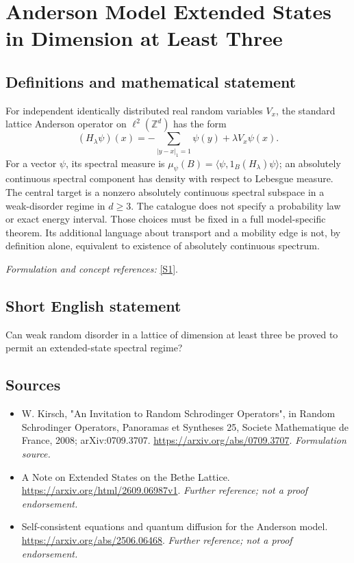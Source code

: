 \documentclass[11pt]{article}
\begin{document}
\section*{\texorpdfstring{Anderson Model Extended States in Dimension at Least Three}{Anderson Model Extended States in Dimension at Least Three}}\label{31}
\subsection{Definitions and mathematical statement}
For independent identically distributed real random variables $V_x$, the standard lattice Anderson operator on $\ell^2({\mathbb{Z}}^d)$ has the form
\[
 (H_\lambda\psi)(x)=-\sum_{|y-x|_1=1}\psi(y)+\lambda V_x\psi(x).
\]
For a vector $\psi$, its spectral measure is $\mu_\psi(B)=\langle\psi,1_B(H_\lambda)\psi\rangle$; an absolutely continuous spectral component has density with respect to Lebesgue measure. The central target is a nonzero absolutely continuous spectral subspace in a weak-disorder regime in $d\ge3$. The catalogue does not specify a probability law or exact energy interval. Those choices must be fixed in a full model-specific theorem. Its additional language about transport and a mobility edge is not, by definition alone, equivalent to existence of absolutely continuous spectrum.
\par\smallskip\textit{Formulation and concept references:} \href{https://arxiv.org/abs/0709.3707}{[S1]}.

\subsection{Short English statement}
Can weak random disorder in a lattice of dimension at least three be proved to permit an extended-state spectral regime?
\subsection{Sources}
\begin{itemize}
\item[S1]W. Kirsch, "An Invitation to Random Schrodinger Operators", in Random Schrodinger Operators, Panoramas et Syntheses 25, Societe Mathematique de France, 2008; arXiv:0709.3707.
\url{https://arxiv.org/abs/0709.3707}.
\textit{Formulation source.}
\item[S2]A Note on Extended States on the Bethe Lattice.
\url{https://arxiv.org/html/2609.06987v1}.
\textit{Further reference; not a proof endorsement.}
\item[S3]Self-consistent equations and quantum diffusion for the Anderson model.
\url{https://arxiv.org/abs/2506.06468}.
\textit{Further reference; not a proof endorsement.}
\end{itemize}
\end{document}

